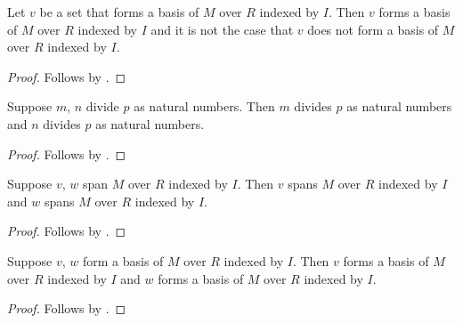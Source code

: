 \begin{proposition}\label{spike_use_indexed_basis}
    Let $v$ be a set that forms a basis of $M$ over $R$ indexed by $I$.
    Then $v$ forms a basis of $M$ over $R$ indexed by $I$ and
        it is not the case that
            $v$ does not form a basis of $M$ over $R$ indexed by $I$.
\end{proposition}
\begin{proof} Follows by \auto. \end{proof}

\begin{proposition}\label{spike_use_plural_divisibility}
    Suppose $m$, $n$ divide $p$ as natural numbers.
    Then $m$ divides $p$ as natural numbers and
        $n$ divides $p$ as natural numbers.
\end{proposition}
\begin{proof} Follows by \auto. \end{proof}

\begin{proposition}\label{spike_use_plural_spanning}
    Suppose $v$, $w$ span $M$ over $R$ indexed by $I$.
    Then $v$ spans $M$ over $R$ indexed by $I$ and
        $w$ spans $M$ over $R$ indexed by $I$.
\end{proposition}
\begin{proof} Follows by \auto. \end{proof}

\begin{proposition}\label{spike_use_plural_basis}
    Suppose $v$, $w$ form a basis of $M$ over $R$ indexed by $I$.
    Then $v$ forms a basis of $M$ over $R$ indexed by $I$ and
        $w$ forms a basis of $M$ over $R$ indexed by $I$.
\end{proposition}
\begin{proof} Follows by \auto. \end{proof}
